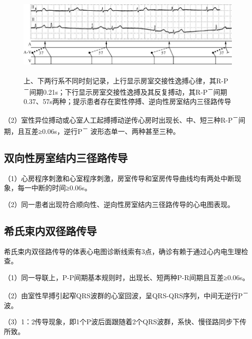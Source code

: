 \begin{figure}[!htbp]
 \centering
 \includegraphics[width=5.79167in,height=1.67708in]{./images/Image00437.jpg}
 \captionsetup{justification=centering}
 \caption{上、下两行系不同时刻记录，上行显示房室交接性逸搏心律，其R-P\textsuperscript{－}间期0.21s；下行显示房室交接性逸搏及其反复搏动，其R-P\textsuperscript{－}间期0.37、57s两种；提示患者存在窦性停搏、逆向性房室结内三径路传导}
 \label{fig25-19}
  \end{figure} 


（2）室性异位搏动或心室人工起搏搏动逆传心房时出现长、中、短三种R-P\textsuperscript{－}间期，且互差≥0.06s，逆行P\textsuperscript{－} 波形态单一、两种甚至三种。

\protect\hypertarget{text00032.htmlux5cux23subid387}{}{}

\subsection{双向性房室结内三径路传导}

（1）心房程序刺激和心室程序刺激，房室传导和室房传导曲线均有两处中断现象，每一中断的时间≥0.06s。

（2）同一患者出现符合顺向性、逆向性房室结内三径路传导的心电图表现。

\protect\hypertarget{text00032.htmlux5cux23subid388}{}{}

\subsection{希氏束内双径路传导}

希氏束内双径路传导的体表心电图诊断线索有3点，确诊有赖于通过心内电生理检查。

（1）同一导联上，P-P间期基本规则时，出现长、短两种P-R间期且互差≥0.06s。

（2）由室性早搏引起窄QRS波群的心室回波，呈QRS-QRS序列，中间无逆行P\textsuperscript{－}波。

（3）1：2传导现象，即1个P波后面跟随着2个QRS波群，系快、慢径路同步下传所致。

\protect\hypertarget{text00032.htmlux5cux23subid389}{}{}

